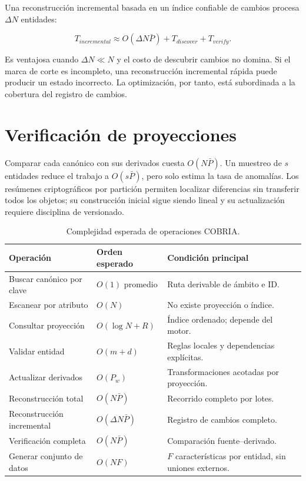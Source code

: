 Una reconstrucción incremental basada en un índice confiable de cambios procesa
$\Delta N$ entidades:

\begin{equation}
T_{incremental}\approx O(\Delta N\bar{P})+T_{discover}+T_{verify}.
\end{equation}

Es ventajosa cuando $\Delta N\ll N$ y el costo de descubrir cambios no domina. Si el
marca de corte es incompleto, una reconstrucción incremental rápida puede producir un estado
incorrecto. La optimización, por tanto, está subordinada a la cobertura del registro de
cambios.

\section{Verificación de proyecciones}

Comparar cada canónico con sus derivados cuesta $O(N\bar{P})$. Un muestreo de $s$
entidades reduce el trabajo a $O(s\bar{P})$, pero solo estima la tasa de anomalías. Los
resúmenes criptográficos por partición permiten localizar diferencias sin transferir todos los objetos;
su construcción inicial sigue siendo lineal y su actualización requiere disciplina de
versionado.

\begin{table}[H]
\centering
\caption{Complejidad esperada de operaciones COBRIA.}
\label{tab:complejidad-operaciones}
\begin{tabularx}{\textwidth}{p{4cm}p{3.2cm}X}
\toprule
Operación & Orden esperado & Condición principal \\
\midrule
Buscar canónico por clave & $O(1)$ promedio & Ruta derivable de ámbito e ID.\\
Escanear por atributo & $O(N)$ & No existe proyección o índice.\\
Consultar proyección & $O(\log N+R)$ & Índice ordenado; depende del motor.\\
Validar entidad & $O(m+d)$ & Reglas locales y dependencias explícitas.\\
Actualizar derivados & $O(P_w)$ & Transformaciones acotadas por proyección.\\
Reconstrucción total & $O(N\bar{P})$ & Recorrido completo por lotes.\\
Reconstrucción incremental & $O(\Delta N\bar{P})$ & Registro de cambios completo.\\
Verificación completa & $O(N\bar{P})$ & Comparación fuente--derivado.\\
Generar conjunto de datos & $O(NF)$ & $F$ características por entidad, sin uniones externos.\\
\bottomrule
\end{tabularx}
\end{table}

